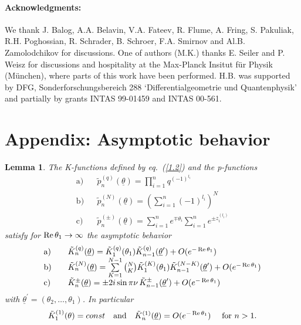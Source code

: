 \documentclass[a4paper,a4paper]{article}
\newtheorem{lemma}[theorem]{Lemma}
\begin{document}
\paragraph{Acknowledgments:}

We thank J. Balog, A.A. Belavin, V.A. Fateev, R. Flu\-me, A. Fring, S.
Pakuliak, R.H. Poghossian, R. Schrader, B. Schroer, F.A. Smirnov and Al.B.
Zamolodchikov for discussions. One of authors (M.K.) thanks E. Seiler and P.
Weisz for discussions and hospitality at the Max-Planck Insitut f\"{u}r
Physik (M\"{u}nchen), where parts of this work have been performed. H.B. was
supported by DFG, Sonderforschungsbereich 288 `Differentialgeometrie und
Quantenphysik' and partially by grants INTAS 99-01459 and INTAS 00-561.

\appendix

\section*{Appendix: Asymptotic behavior}

\begin{lemma}
\label{l4.1}The K-functions defined by eq.~(\ref{1.2}) and the p-functions 
\[
\begin{array}{lll}
\mathrm{a)} &  & \tilde{p}_{n}^{(q)}(\underline{\theta })=\prod%
\limits_{i=1}^{n}q^{(-1)^{l_{i}}} \\ 
\mathrm{b)} &  & \tilde{p}_{n}^{(N)}(\underline{\theta })=\left(
\sum\limits_{i=1}^{n}(-1)^{l_{i}}\right) ^{N} \\ 
\mathrm{c)} &  & \tilde{p}_{n}^{(\pm )}(\underline{\theta }%
)=\sum\limits_{i=1}^{n}e^{\mp \theta _{i}}\sum\limits_{i=1}^{n}e^{\pm
z_{i}^{(l_{i})}}
\end{array}
\]
satisfy for $\mathop{\rm Re}\theta _{1}\rightarrow \infty $ the asymptotic
behavior 
\[
\begin{array}{lll}
\mathrm{a)} &  & \tilde{K}_{n}^{(q)}(\underline{\theta })=\tilde{K}%
_{1}^{(q)}(\theta _{1})\tilde{K}_{n-1}^{(q)}(\underline{\theta }^{\prime
})+O(e^{-\mathop{\rm Re}\theta _{1}}) \\ 
\mathrm{b)} &  & \tilde{K}_{n}^{(N)}(\underline{\theta })=\sum%
\limits_{K=1}^{N-1}\binom{N}{K}\tilde{K}_{1}^{(K)}(\theta _{1})\tilde{K}%
_{n-1}^{(N-K)}(\underline{\theta }^{\prime })+O(e^{-\mathop{\rm Re}\theta
_{1}}) \\ 
\mathrm{c)} &  & \tilde{K}_{n}^{\pm }(\underline{\theta })=\pm 2i\sin \pi
\nu \,\tilde{K}_{n-1}^{\pm }(\underline{\theta }^{\prime })+O(e^{-%
\mathop{\rm Re}\theta _{1}})
\end{array}
\]
with $\underline{\theta }^{\prime }=(\theta _{2},\dots ,\theta _{1})$. In
particular 
\[
\tilde{K}_{1}^{(1)}(\theta )=const\quad \text{and}\quad \tilde{K}_{n}^{(1)}(%
\underline{\theta })=O(e^{-\mathop{\rm Re}\theta _{1}})\quad \text{ for }%
n>1. 
\]
\end{lemma}
\end{document}
